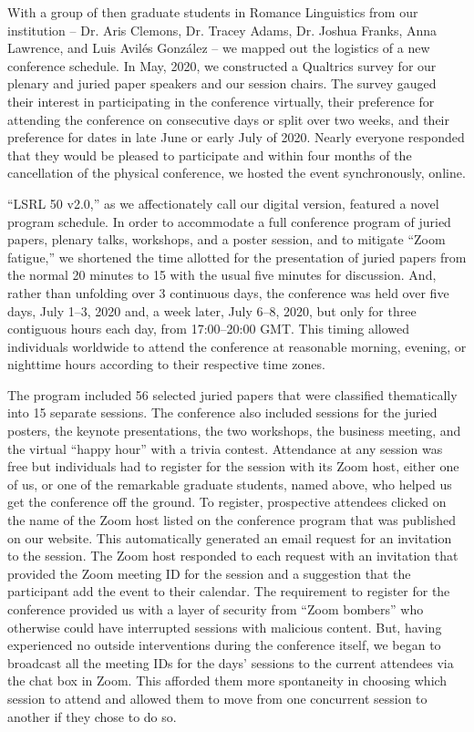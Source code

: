 \documentclass[output=paper,draftmode]{langscibook}
\begin{document}
With a group of then graduate students in Romance Linguistics from our institution -- Dr. Aris Clemons, Dr. Tracey Adams, Dr. Joshua Franks, Anna Lawrence, and Luis Avilés González -- we mapped out the logistics of a new conference schedule. In May, 2020, we constructed a Qualtrics survey for our plenary and juried paper speakers and our session chairs. The survey gauged their interest in participating in the conference virtually, their preference for attending the conference on consecutive days or split over two weeks, and their preference for dates in late June or early July of 2020.  Nearly everyone responded that they would be pleased to participate and within four months of the cancellation of the physical conference, we hosted the event synchronously, online.

“LSRL 50 v2.0,” as we affectionately call our digital version, featured a novel program schedule. In order to accommodate a full conference program of juried papers, plenary talks, workshops, and a poster session, and to mitigate “Zoom fatigue,” we shortened the time allotted for the presentation of juried papers from the normal 20 minutes to 15 with the usual five minutes for discussion. And, rather than unfolding over 3 continuous days, the conference was held over five days, July 1--3, 2020 and, a week later, July 6--8, 2020, but only for three contiguous hours each day, from 17:00--20:00 GMT. This timing allowed individuals worldwide to attend the conference at reasonable morning, evening, or nighttime hours according to their respective time zones.

The program included 56 selected juried papers that were classified thematically into 15 separate sessions. The conference also included sessions for the juried posters, the keynote presentations, the two workshops, the business meeting, and the virtual “happy hour” with a trivia contest. Attendance at any session was free but individuals had to register for the session with its Zoom host, either one of us, or one of the remarkable graduate students, named above, who helped us get the conference off the ground. To register, prospective attendees clicked on the name of the Zoom host listed on the conference program that was published on our website. This automatically generated an email request for an invitation to the session. The Zoom host responded to each request with an invitation that provided the Zoom meeting ID for the session and a suggestion that the participant add the event to their calendar. The requirement to register for the conference provided us with a layer of security from “Zoom bombers” who otherwise could have interrupted sessions with malicious content. But, having experienced no outside interventions during the conference itself, we began to broadcast all the meeting IDs for the days’ sessions to the current attendees via the chat box in Zoom. This afforded them more spontaneity in choosing which session to attend and allowed them to move from one concurrent session to another if they chose to do so.
\end{document}
